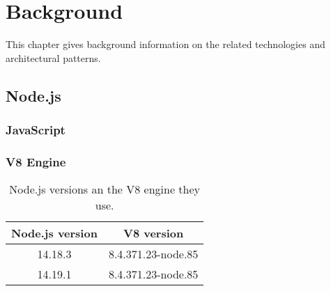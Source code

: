 \chapter{Background\label{background}}
This chapter gives background information on the related technologies and architectural patterns.

\section{Node.js}
\subsection{JavaScript}
\subsection{V8 Engine}

\begin{table}
    \begin{tabular}{|c c|} 
     \hline
     Node.js version & V8 version \\ [0.5ex] 
     \hline
     14.18.3 & 8.4.371.23-node.85  \\ 
     \hline
      14.19.1 & 8.4.371.23-node.85  \\ 
     \hline
    \end{tabular}
    \caption{Node.js versions an the V8 engine they use.}
\end{table}
